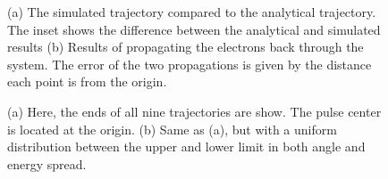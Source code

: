 \documentclass[12pt,letterpaper]{article}
\begin{document}
\begin{figure}[tb]
   \centering
   \hspace{4mm}
   \caption{
   (a) The simulated trajectory compared to the analytical trajectory. The inset shows the difference between the analytical and simulated results
   (b) Results of propagating the electrons back through the system. The error of the two propagations is given by the distance each point is from the origin. 
   }
\end{figure}

\begin{figure}[tb]
   \centering
   \hspace{4mm}
   \caption{
   (a) Here, the ends of all nine trajectories are show. The pulse center is located at the origin.
   (b) Same as (a), but with a uniform distribution between the upper and lower limit in both angle and energy spread. 
   }
\end{figure}
\end{document}
